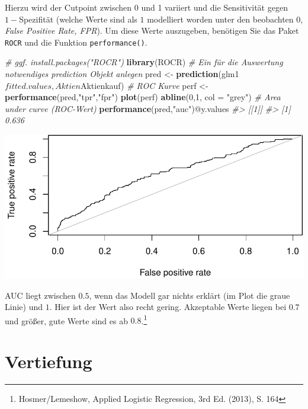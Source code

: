 \documentclass[12pt,ngerman,]{book}
\newenvironment{Shaded}{\begin{snugshade}}{\end{snugshade}}
\newcommand{\KeywordTok}[1]{\textcolor[rgb]{0.13,0.29,0.53}{\textbf{{#1}}}}
\newcommand{\DataTypeTok}[1]{\textcolor[rgb]{0.13,0.29,0.53}{{#1}}}
\newcommand{\DecValTok}[1]{\textcolor[rgb]{0.00,0.00,0.81}{{#1}}}
\newcommand{\StringTok}[1]{\textcolor[rgb]{0.31,0.60,0.02}{{#1}}}
\newcommand{\CommentTok}[1]{\textcolor[rgb]{0.56,0.35,0.01}{\textit{{#1}}}}
\newcommand{\NormalTok}[1]{{#1}}
\let\rmarkdownfootnote\footnote%
\def\footnote{\protect\rmarkdownfootnote}
\renewenvironment{Shaded}{\begin{kframe}}{\end{kframe}}
\begin{document}
Hierzu wird der Cutpoint zwischen 0 und 1 variiert und die Sensitivität
gegen \(1-\)Spezifität (welche Werte sind als \(1\) modelliert worden
unter den beobachten \(0\), \emph{False Positive Rate, FPR}). Um diese
Werte auszugeben, benötigen Sie das Paket \texttt{ROCR} und die Funktion
\texttt{performance()}.

\begin{Shaded}
\begin{Highlighting}[]
\CommentTok{# ggf. install.packages("ROCR")}
\KeywordTok{library}\NormalTok{(ROCR)}
\CommentTok{# Ein für die Auswertung notwendiges prediction Objekt anlegen}
\NormalTok{pred <-}\StringTok{ }\KeywordTok{prediction}\NormalTok{(glm1$fitted.values, Aktien$Aktienkauf)}
\CommentTok{# ROC Kurve}
\NormalTok{perf <-}\StringTok{ }\KeywordTok{performance}\NormalTok{(pred,}\StringTok{"tpr"}\NormalTok{,}\StringTok{"fpr"}\NormalTok{)}
\KeywordTok{plot}\NormalTok{(perf)}
\KeywordTok{abline}\NormalTok{(}\DecValTok{0}\NormalTok{,}\DecValTok{1}\NormalTok{, }\DataTypeTok{col =} \StringTok{"grey"}\NormalTok{)}
\CommentTok{# Area under curve (ROC-Wert)}
\KeywordTok{performance}\NormalTok{(pred,}\StringTok{"auc"}\NormalTok{)@y.values}
\CommentTok{#> [[1]]}
\CommentTok{#> [1] 0.636}
\end{Highlighting}
\end{Shaded}

\begin{center}\includegraphics[width=0.7\linewidth]{072_klassifizierende_Regression_files/figure-latex/unnamed-chunk-15-1} \end{center}

AUC liegt zwischen \(0.5\), wenn das Modell gar nichts erklärt (im Plot
die graue Linie) und \(1\). Hier ist der Wert also recht gering.
Akzeptable Werte liegen bei \(0.7\) und größer, gute Werte sind es ab
\(0.8\).\footnote{Hosmer/Lemeshow, Applied Logistic Regression, 3rd Ed.
  (2013), S. 164}

\section{Vertiefung}\label{vertiefung-1}
\end{document}
